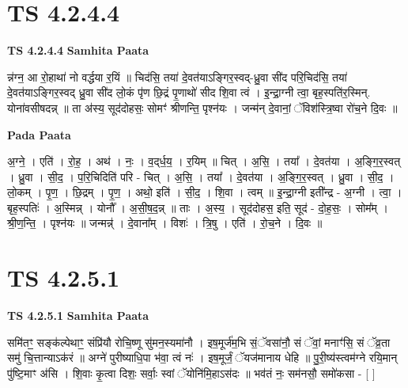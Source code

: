 \documentclass[17pt]{extarticle}
\begin{document}

\section{ TS 4.2.4.4 }

\textbf{TS 4.2.4.4 } \newline
\textbf{Samhita Paata} \newline

न्न॑ग्न॒ आ रो॒हाथा॑ नो वर्द्धया र॒यिं ॥ चिद॑सि॒ तया॑ दे॒वत॑याऽङ्गिर॒स्वद्-ध्रु॒वा सी॑द परि॒चिद॑सि॒ तया॑ दे॒वत॑याऽङ्गिर॒स्वद् ध्रु॒वा सी॑द लो॒कं पृ॑ण छि॒द्रं पृ॒णाथो॑ सीद शि॒वा त्वं । इ॒न्द्रा॒ग्नी त्वा॒ बृह॒स्पति॑र॒स्मिन्. योना॑वसीषदन्न् ॥ ता अ॑स्य॒ सूद॑दोहसः॒ सोमꣳ॑ श्रीणन्ति॒ पृश्न॑यः । जन्म॑न् दे॒वानां॒ ॅविश॑स्त्रि॒ष्वा रो॑च॒ने दि॒वः ॥ \newline

\textbf{Pada Paata} \newline

अ॒ग्ने॒ । एति॑ । रो॒ह॒ । अथ॑ । नः॒ । व॒द्‌र्ध॒य॒ । र॒यिम् ॥ चित् । अ॒सि॒ । तया᳚ । दे॒वत॑या । अ॒ङ्गि॒र॒स्वत् । ध्रु॒वा । सी॒द॒ । प॒रि॒चिदिति॑ परि - चित् । अ॒सि॒ । तया᳚ । दे॒वत॑या । अ॒ङ्गि॒र॒स्वत् । ध्रु॒वा । सी॒द॒ । लो॒कम् । पृ॒ण॒ । छि॒द्रम् । पृ॒ण॒ । अथो॒ इति॑ । सी॒द॒ । शि॒वा । त्वम् ॥ इ॒न्द्रा॒ग्नी इती᳚न्द्र - अ॒ग्नी । त्वा॒ । बृह॒स्पतिः॑ । अ॒स्मिन्न् । योनौ᳚ । अ॒सी॒ष॒द॒न्न् ॥ ताः । अ॒स्य॒ । सूद॑दोहस॒ इति॒ सूद॑ - दो॒ह॒सः॒ । सोम᳚म् । श्री॒ण॒न्ति॒ । पृश्न॑यः ॥ जन्मन्न्॑ । दे॒वाना᳚म् । विशः॑ । त्रि॒षु । एति॑ । रो॒च॒ने । दि॒वः ॥  \newline





\section{ TS 4.2.5.1 }

\textbf{TS 4.2.5.1 } \newline
\textbf{Samhita Paata} \newline

समि॑तꣳ॒॒ सङ्क॑ल्पेथाꣳ॒॒ संप्रि॑यौ रोचि॒ष्णू सु॑मन॒स्यमा॑नौ । इष॒मूर्ज॑म॒भि सं॒ॅवसा॑नौ॒ सं ॅवां॒ मनाꣳ॑सि॒ सं ॅव्र॒ता समु॑ चि॒त्तान्याऽक॑रं ॥ अग्ने॑ पुरीष्याधि॒पा भ॑वा॒ त्वं नः॑ । इष॒मूर्जं॒ ॅयज॑मानाय धेहि ॥ पु॒री॒ष्य॑स्त्वम॑ग्ने रयि॒मान् पु॑ष्टि॒माꣳ अ॑सि । शि॒वाः कृ॒त्वा दिशः॒ सर्वाः॒ स्वां ॅयोनि॑मि॒हाऽस॑दः ॥ भव॑तं नः॒ सम॑नसौ॒ समो॑कसा - [  ] \newline
\end{document}
